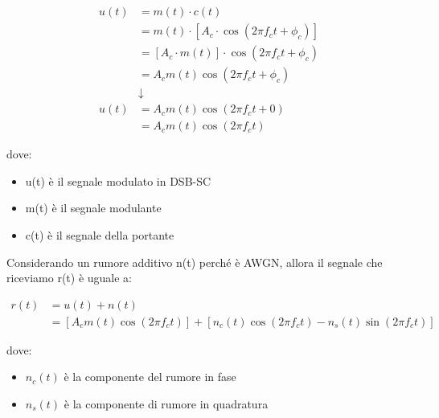 {
    \Large 
    \begin{equation}
        \begin{split}
            u (t) 
            &= 
            m(t) \cdot c(t)
            \\
            &=
            m(t) \cdot \left[ A_c \cdot \cos(2 \pi f_c t + \phi_c) \right]
            \\
            &= 
            \left[A_c \cdot m(t) \right] \cdot \cos(2 \pi f_c t + \phi_c)
            \\
            &= 
            A_c m(t) \cos(2 \pi f_c t + \phi_c)
            \\
            &\downarrow 
            \\
            u(t)
            &=
            A_c m(t) \cos(2 \pi f_c t + 0)
            \\
            &=
            A_c m(t) \cos(2 \pi f_c t)
        \end{split}
    \end{equation}
}

dove: 

\begin{itemize}
    \item u(t) è il segnale modulato in DSB-SC 
    \item m(t) è il segnale modulante 
    \item c(t) è il segnale della portante
\end{itemize}

Considerando un rumore additivo n(t) perché è AWGN, 
allora il segnale che riceviamo r(t) è uguale a: 

{
    \Large 
    \begin{equation}
        \begin{split}
            r(t) 
            &= 
            u(t) + n(t)
            \\
            &=
            \left[
                A_c m(t) \cos(2 \pi f_c t)
            \right]
            +
            \left[
                n_c (t) \cos(2 \pi f_c t)
                - 
                n_s(t) \sin(2 \pi f_c t)
            \right]
        \end{split}
    \end{equation}
}

dove: 

\begin{itemize}
    \item $n_c (t)$ è la componente del rumore in fase 
    \item $n_s (t)$ è la componente di rumore in quadratura
\end{itemize}

